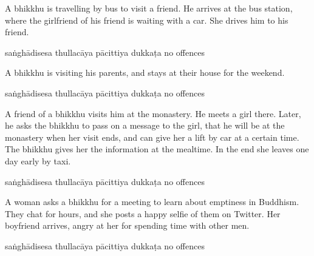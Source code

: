 \begin{exam}{\autoExamName}
\begin{problem*}
\begin{parts}
\item A bhikkhu is travelling by bus to visit a friend. He arrives at the bus
  station, where the girlfriend of his friend is waiting with a car. She drives
  him to his friend.

  \bigskip

  \begin{answers}{5}
    \bChoices
     saṅghādisesa\eAns
     thullacāya\eAns
     pācittiya\eAns
     dukkaṭa\eAns
     no offences\eAns
    \eChoices
  \end{answers}

  \bigskip

\item A bhikkhu is visiting his parents, and stays at their house for the weekend.

  \bigskip

  \begin{answers}{5}
    \bChoices
     saṅghādisesa\eAns
     thullacāya\eAns
     pācittiya\eAns
     dukkaṭa\eAns
     no offences\eAns
    \eChoices
  \end{answers}

  \bigskip

\item A friend of a bhikkhu visits him at the monastery. He meets a girl there.
  Later, he asks the bhikkhu to pass on a message to the girl, that he will be
  at the monastery when her visit ends, and can give her a lift by car at a
  certain time. The bhikkhu gives her the information at the mealtime. In the
  end she leaves one day early by taxi. 

  \bigskip

  \begin{answers}{5}
    \bChoices
     saṅghādisesa\eAns
     thullacāya\eAns
     pācittiya\eAns
     dukkaṭa\eAns
     no offences\eAns
    \eChoices
  \end{answers}

  \bigskip

\item A woman asks a bhikkhu for a meeting to learn about emptiness in Buddhism.
  They chat for hours, and she posts a happy selfie of them on Twitter. Her
  boyfriend arrives, angry at her for spending time with other men.

  \bigskip

  \begin{answers}{5}
    \bChoices
     saṅghādisesa\eAns
     thullacāya\eAns
     pācittiya\eAns
     dukkaṭa\eAns
     no offences\eAns
    \eChoices
  \end{answers}


\end{parts}
\end{problem*}
\end{exam}
